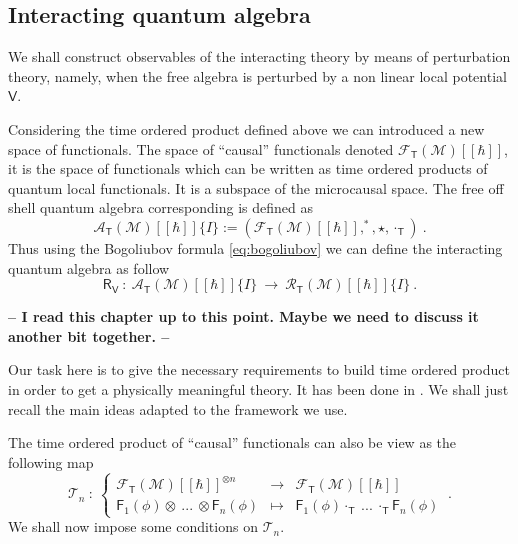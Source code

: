 \documentclass[11pt]{book}
\newcommand{\com}[1]{{\color{red}\bf #1}}
\newcommand{\Acal}{\mathcal{A}}
\newcommand{\Fcal}{\mathcal{F}}
\newcommand{\Mcal}{\mathcal{M}}
\newcommand{\Rcal}{\mathcal{R}}
\newcommand{\Tcal}{\mathcal{T}}
\newcommand{\Fsf}{\mathsf{F}}
\newcommand{\Rsf}{\mathsf{R}}
\newcommand{\Tsf}{\mathsf{T}}
\newcommand{\Vsf}{\mathsf{V}}
\theoremstyle{break}
\begin{document}
\subsection{Interacting quantum algebra}
\label{p:INT_Q_ALG}


We shall construct observables of the interacting theory by means of perturbation theory, namely, when the free algebra is perturbed by a non linear local potential $\Vsf$. 



Considering the time ordered product defined above we can introduced a new space of functionals. The space of ``causal'' functionals denoted $\Fcal_\Tsf(\Mcal)[[\hbar]]$\index{$\Fcal_\Tsf(\Mcal)$}, it is the space of functionals which can be written as time ordered products of quantum local functionals. It is a subspace of the microcausal space. The free off shell quantum algebra corresponding is defined as 
%
\begin{equation}
\Acal_\Tsf(\Mcal)[[\hbar]]\{I\} := \left( \Fcal_\Tsf(\Mcal)[[\hbar]] , ^\ast , \star , \cdot_\Tsf \right) \ . 
\label{eq:alg_free_int}
\end{equation}
\index{$\Acal_\Tsf(\Mcal)[[\hbar]]\{I\}$}
%
Thus using the Bogoliubov formula \eqref{eq:bogoliubov} we can define the interacting quantum algebra as follow
%
\begin{equation}
\Rsf_\Vsf \ : \ \Acal_\Tsf(\Mcal)[[\hbar]]\{I\} \ \to \ \Rcal_\Tsf(\Mcal)[[\hbar]]\{I\} \ .
\label{eq:alg_int}
\end{equation}
\index{$\Rcal_\Tsf(\Mcal)[[\hbar]]\{I\}$}







\com{-- I read this chapter up to this point. Maybe we need to discuss it another bit together. --}


Our task here is to give the necessary requirements to build time ordered product in order to get a physically meaningful theory. It has been done in \cite{hollands_local_2001,hollands_existence_2002}. We shall just recall the main ideas adapted to the framework we use.


The  time ordered product of ``causal'' functionals can also be view as the following map
%
\begin{equation}
\Tcal_n \ : \ 
\left\{
\begin{array}{lcl}
\Fcal_\Tsf(\Mcal)[[\hbar]]^{\otimes n} & \to & \Fcal_\Tsf(\Mcal)[[\hbar]] \\
\Fsf_1(\phi) \otimes \ ... \ \otimes \Fsf_n(\phi) & \mapsto & \Fsf_1(\phi) \cdot_{\Tsf} \ ... \ \cdot_{\Tsf} \Fsf_n(\phi)
\end{array}
\right. \ .
\label{eq:time_ordered_op}
\end{equation}
%
We shall now impose some conditions on $\Tcal_n$. 
\end{document}

